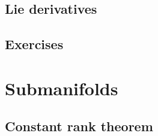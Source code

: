 \documentclass{../../large}
\begin{document}
\section{Lie derivatives}
\begin{prb}
\end{prb}

\section*{Exercises}
\begin{prb}[Orientation]
\end{prb}











\chapter{Submanifolds}


\section{Constant rank theorem}
\end{document}

